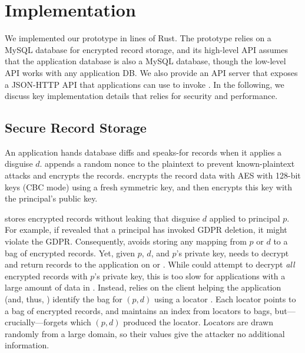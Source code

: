 \section{Implementation}
\label{s:impl}

%
We implemented our \sys prototype in  lines of Rust.
%
The prototype relies on a MySQL database for encrypted record storage, and
its high-level API assumes that the application database is also a MySQL
database, though the low-level API works with any application DB.
%
We also provide an API server that exposes a JSON-HTTP API that applications
can use to invoke \sys.
%
In the following, we discuss key implementation details that \sys relies for
security and performance.
%

\subsection{Secure Record Storage}
\label{s:impl-locators}
%
An application hands \sys database diffs and speaks-for records when it applies
a disguise $d$.
%
\sys appends a random nonce to the plaintext to prevent known-plaintext attacks
and encrypts the records.
%
\sys encrypts the record data with AES with 128-bit keys (CBC mode) using a fresh symmetric key, and
then encrypts this key with the principal's public key.
%

%
\sys stores encrypted records without leaking that disguise $d$ applied to
principal $p$.
%
For example, if \sys revealed that a principal has invoked GDPR deletion, it
might violate the GDPR.
%
Consequently, \sys avoids storing any mapping from $p$ or $d$ to a bag of
encrypted records.
%
Yet, given $p$, $d$, and $p$'s private key, \sys needs to decrypt and return
records to the application on  or .
%
While \sys could attempt to decrypt \emph{all} encrypted records with $p$'s
private key, this is too slow for applications with a large amount
of data in \sys.
%
Instead, \sys relies on the client helping the application (and, thus, \sys)
identify the bag for $(p, d)$ using a locator .
%
Each locator points to a bag of encrypted records, and \sys maintains an index
from locators to bags, but---crucially---forgets which $(p, d)$ produced the
locator.
%
Locators are drawn randomly from a large domain, so their values give
the attacker no additional information.
%


